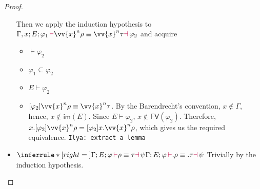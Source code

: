 \documentclass[a4,natbib=false]{article}
\newtheorem{lemma}{Lemma}
\newcommand{\ilyam}[1]{{\color{red} \texttt{Ilya:  #1}}}
\newcommand{\subst}[3]{{#1}\{{#2}\,:=\,{#3}\}}
\newcommand{\ctxtapp}[2]{[{#1}] {#2}}
\newcommand{\judgectx}[2]{{#1} \vdash {#2}}
\newcommand{\judgeequivunt}[2]{{#1} \equiv {#2}}
\newcommand{\judgeunify}[4]{{#1}\,{\color{purple}\vdash} {#2} \equiv {#3} {\color{purple}\dashv}\,{#4}}
\newcommand{\fv}[1]{\mathsf{FV}(#1)}
\newcommand{\codom}[1]{\mathsf{im}(#1)}
\newcommand{\absclose}[2]{\vv{x}^{#1} #2}
\newcommand{\Infer}[3]{\inferrule*[right={#1}]{#2}{#3}}
\begin{document}
\begin{proof}
\begin{itemize}
      Then we apply the induction hypothesis to
      $ \judgeunify{\Gamma, x; E; \varphi_1} {\absclose{n}{\rho}} {\absclose{n}{\tau}} {\varphi_2} $
      and acquire 
      \begin{itemize}
        \item $\judgectx{}{\varphi_2}$
        \item $\varphi_1 \subseteq \varphi_2$
        \item $\judgectx{E}{\varphi_2}$
        \item
          $\judgeequivunt{\ctxtapp{\varphi_2}{\absclose{n}{\rho}}}{\absclose{n}{\tau}}$.
          By the Barendrecht's convention, $x \notin \Gamma$, hence, 
          $x \notin \codom{E}$. Since $\judgectx{E}{\varphi_2}$, $x \notin \fv{\varphi_2}$.
          Therefore, $x.\ctxtapp{\varphi_2}{\absclose{n}{\rho}} =
          \ctxtapp{\varphi_2}{x.\absclose{n}{\rho}}$, which gives us the
          required equivalence. 
          \ilyam{extract a lemma}
      \end{itemize}

    \item
      $
      \Infer{}
      {
        \judgeunify{\Gamma; E; \varphi}
        {\rho}
        {\tau}
        {\psi}
      }
      {
        \judgeunify{\Gamma; E; \varphi}
        {.\rho}
        {.\tau}
        {\psi}
      }
      $ 
      Trivially by the induction hypothesis. 




  \end{itemize}

\end{proof}



\end{document}
